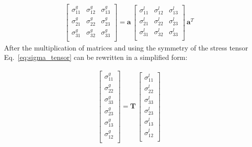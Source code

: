 \documentclass[a4paper,fleqn]{cas-sc}
\begin{document}
\begin{eqnarray}
	\left [ 
	\begin{array}{ccc}
		\sigma^g_{11} & \sigma^g_{12} & \sigma^g_{13}\\
		\sigma^g_{21} & \sigma^g_{22} & \sigma^g_{23}\\
		\sigma^g_{31} & \sigma^g_{32} & \sigma^g_{33}\\
	\end{array}
	\right ]
	=
	\textbf{a}\,
	\left [ 
	\begin{array}{ccc}
		\sigma^l_{11} & \sigma^l_{12} & \sigma^l_{13}\\
		\sigma^l_{21} & \sigma^l_{22} & \sigma^l_{23}\\
		\sigma^l_{31} & \sigma^l_{32} & \sigma^l_{33}\\
	\end{array}
	\right ]
	\,\textbf{a}^T
	\label{eq:sigma_tensor}
\end{eqnarray}
After the multiplication of matrices and using the symmetry of the stress tensor Eq.~\ref{eq:sigma_tensor} can be rewritten in a simplified form:

\begin{eqnarray}
	\left [
	\begin{array}{c}
		\sigma^g_{11}\\
		\sigma^g_{22}\\ 
		\sigma^g_{33}\\ 
		\sigma^g_{23}\\
		\sigma^g_{13}\\
		\sigma^g_{12}\\
	\end{array}
	\right ]=
	\textbf{T}\,\left [
	\begin{array}{c}
		\sigma^l_{11}\\
		\sigma^l_{22}\\ 
		\sigma^l_{33}\\
		\sigma^l_{23}\\
		\sigma^l_{13}\\
		\sigma^l_{12}\\
	\end{array}
	\right ]
	\label{eq:stress}
\end{eqnarray}
\end{document}
